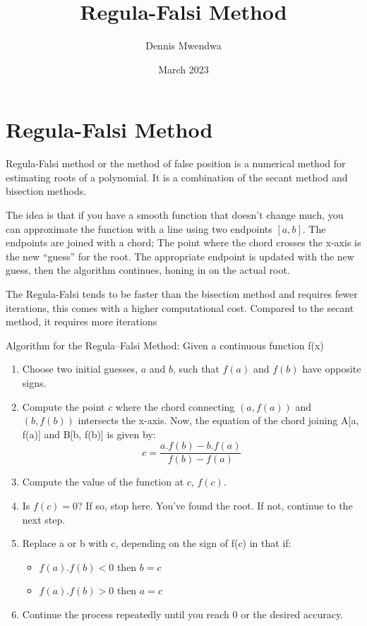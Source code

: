 \documentclass{article}
\title{Regula-Falsi Method}
\author{Dennis Mwendwa}
\date{March 2023}
\begin{document}
\maketitle
\section*{Regula-Falsi Method}

Regula-Falsi method or the method of false position is a numerical method for estimating roots of a polynomial. It is a combination of the secant method and bisection methods.

The idea is that if you have a smooth function that doesn’t change much, you can approximate the function with a line using two endpoints $[a, b]$. The endpoints are joined with a chord; The point where the chord crosses the x-axis is the new “guess” for the root. The appropriate endpoint is updated with the new guess, then the algorithm continues, honing in on the actual root.

The Regula-Falsi tends to be faster than the bisection method and requires fewer iterations, this comes with a higher computational cost. Compared to the secant method, it requires more iterations

Algorithm for the Regula–Falsi Method: Given a continuous function f(x)
  \begin{enumerate}
     \item Choose two initial guesses, $a$ and $b$, such that $f(a)$ and $f(b)$ have opposite signs.
     \item Compute the point $c$ where the chord connecting $(a, f(a))$ and $(b, f(b))$ intersects the x-axis. Now, the equation of the chord joining A[a, f(a)] and B[b, f(b)] is given by: $$c = \frac{a.f(b)-b.f(a)}{f(b)-f(a)} $$ 
     \item Compute the value of the function at $c$, $f(c)$.
     \item  Is $f(c) = 0$? If so, stop here. You’ve found the root. If not, continue to the next step.
     \item Replace a or b with c, depending on the sign of f(c) in that if:
     \begin{itemize} 
        \item $f(a). f(b) < 0$ then $b = c$
         \item $f(a). f(b) > 0$ then $a = c$
      \end{itemize}
       \item Continue the process repeatedly until you reach 0 or the desired accuracy.
  \end{enumerate}
  
\end{document}
